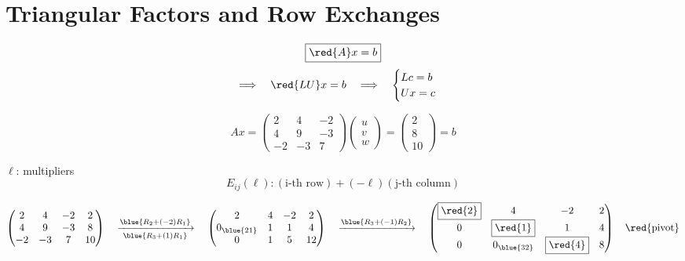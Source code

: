 \section{Triangular Factors and Row Exchanges}

\[
\boxed{\red{A}x = b}
\]
\[
\Longrightarrow \quad \red{LU}x = b \quad \Longrightarrow \quad \begin{cases}
    Lc = b \\
    Ux = c
\end{cases}
\]

\begin{eg}
\[
Ax = \begin{pmatrix}
    2 & 4 & -2 \\
    4 & 9 & -3 \\
    -2 & -3 & 7
\end{pmatrix} \begin{pmatrix}
    u \\ v \\ w
\end{pmatrix} = \begin{pmatrix}
    2 \\ 8 \\ 10
\end{pmatrix} = b
\]
\end{eg}

\begin{remark}
    \(\ell\): multipliers
    \[
        E_{ij}(\ell): (\text{i-th row}) + (-\ell)(\text{j-th column})
    \]
\end{remark}

\[
    \begin{pmatrix}
        2 & 4 & -2 & 2 \\
        4 & 9 & -3 & 8 \\
        -2 & -3 & 7 & 10
    \end{pmatrix} \quad \xrightarrow[\blue{R_3 + (1)R_1}]{\blue{R_2 + (-2)R_1}} \quad \begin{pmatrix}
        2 & 4 & -2 & 2 \\
        0_{\blue{21}} & 1 & 1 & 4 \\
        0 & 1 & 5 & 12
    \end{pmatrix} \quad \xrightarrow{\blue{R_3 + (-1)R_2}} \quad \begin{pmatrix}
        \boxed{\red{2}} & 4 & -2 & 2 \\
        0 & \boxed{\red{1}} & 1 & 4 \\
        0 & 0_{\blue{32}} & \boxed{\red{4}} & 8
    \end{pmatrix} \quad \text{\red{pivot}}
\]

